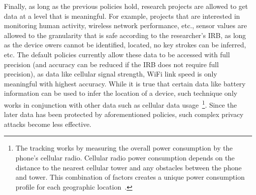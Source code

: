 Finally, as long as the previous policies hold, research 
projects are allowed to get data at a level that is meaningful. For example, 
projects that are interested in monitoring human activity, wireless network 
performance, etc., sensor values are allowed to the granularity that is safe 
according to the researcher's IRB, 
as long as the device owers cannot be identified, located, no key strokes 
can be inferred, etc. The default policies currently allow these data to be 
accessed with full precision (and accuracy can be reduced if the IRB
does not require full precision), as data like cellular signal strength, WiFi 
link speed is only meaningful with highest accuracy. While it is true that
certain data like battery information can be used to infer the location of 
a device, such technique only works in conjunction with other data 
such as cellular data usage~\cite{michalevsky2015powerspy}\footnote{\scriptsize 
The tracking works by measuring the overall power consumption 
by the phone's cellular radio. Cellular radio power consumption depends 
on the distance to the nearest cellular tower and any obstacles between 
the phone and tower. This combination of factors creates a unique power 
consumption profile for each geographic location~\cite{battery-use}.}. 
Since the later data has been protected by aforementioned policies, such 
complex privacy attacks become less effective. 

